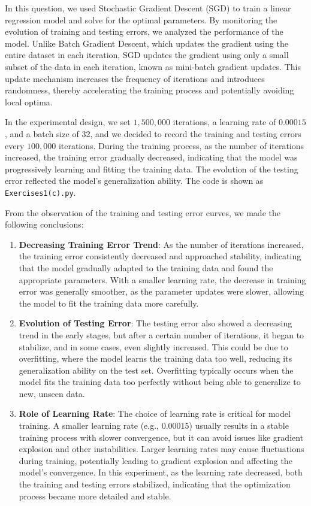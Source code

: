 \documentclass[a4paper, utf8]{ctexart}
\begin{document}
	In this question, we used Stochastic Gradient Descent (SGD) to train a linear regression model and solve for the optimal parameters. By monitoring the evolution of training and testing errors, we analyzed the performance of the model. Unlike Batch Gradient Descent, which updates the gradient using the entire dataset in each iteration, SGD updates the gradient using only a small subset of the data in each iteration, known as mini-batch gradient updates. This update mechanism increases the frequency of iterations and introduces randomness, thereby accelerating the training process and potentially avoiding local optima.
	
	In the experimental design, we set $1,500,000$ iterations, a learning rate of $0.00015$, and a batch size of 32, and we decided to record the training and testing errors every $100,000$ iterations. During the training process, as the number of iterations increased, the training error gradually decreased, indicating that the model was progressively learning and fitting the training data. The evolution of the testing error reflected the model’s generalization ability. The code is shown as \verb|Exercises1(c).py|. 
	
	From the observation of the training and testing error curves, we made the following conclusions:
	
	\begin{enumerate}[itemsep=2pt, topsep=0pt, parsep=0pt]
	    \item \textbf{Decreasing Training Error Trend}: As the number of iterations increased, the training error consistently decreased and approached stability, indicating that the model gradually adapted to the training data and found the appropriate parameters. With a smaller learning rate, the decrease in training error was generally smoother, as the parameter updates were slower, allowing the model to fit the training data more carefully.
	    \item \textbf{Evolution of Testing Error}: The testing error also showed a decreasing trend in the early stages, but after a certain number of iterations, it began to stabilize, and in some cases, even slightly increased. This could be due to overfitting, where the model learns the training data too well, reducing its generalization ability on the test set. Overfitting typically occurs when the model fits the training data too perfectly without being able to generalize to new, unseen data.
	    \item \textbf{Role of Learning Rate}: The choice of learning rate is critical for model training. A smaller learning rate (e.g., 0.00015) usually results in a stable training process with slower convergence, but it can avoid issues like gradient explosion and other instabilities. Larger learning rates may cause fluctuations during training, potentially leading to gradient explosion and affecting the model's convergence. In this experiment, as the learning rate decreased, both the training and testing errors stabilized, indicating that the optimization process became more detailed and stable.
	\end{enumerate}
	
\end{document}
